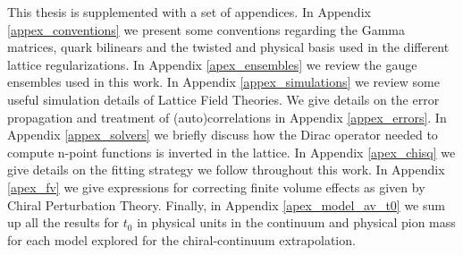 This thesis is supplemented with a set of appendices. In Appendix \ref{appex_conventions} we present some conventions regarding the Gamma matrices, quark bilinears and the twisted and physical basis used in the different lattice regularizations. In Appendix \ref{apex_ensembles} we review the gauge ensembles used in this work. In Appendix \ref{appex_simulations} we review some useful simulation details of Lattice Field Theories. We give details on the error propagation and treatment of (auto)correlations in Appendix \ref{appex_errors}. In Appendix \ref{appex_solvers} we briefly discuss how the Dirac operator needed to compute n-point functions is inverted in the lattice. In Appendix \ref{apex_chisq} we give details on the fitting strategy we follow throughout this work. In Appendix \ref{apex_fv} we give expressions for correcting finite volume effects as given by Chiral Perturbation Theory. Finally, in Appendix \ref{apex_model_av_t0} we sum up all the results for $t_0$ in physical units in the continuum and physical pion mass for each model explored for the chiral-continuum extrapolation.

